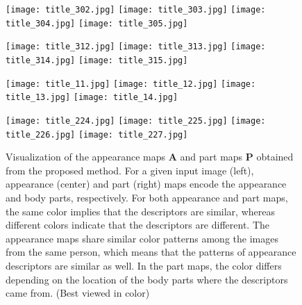 \documentclass{llncs}
\begin{document}
\begin{figure}[t]
\centering
	\begin{minipage}{0.99\linewidth}
	\begin{minipage}{0.24\linewidth}
\centering
      \texttt{[image: title\_302.jpg]}
      \texttt{[image: title\_303.jpg]}
      \texttt{[image: title\_304.jpg]}
      \texttt{[image: title\_305.jpg]}
    \end{minipage}
	\begin{minipage}{0.24\linewidth}
\centering
      \texttt{[image: title\_312.jpg]}
      \texttt{[image: title\_313.jpg]}
      \texttt{[image: title\_314.jpg]}
      \texttt{[image: title\_315.jpg]}
    \end{minipage}
	\begin{minipage}{0.24\linewidth}
\centering
      \texttt{[image: title\_11.jpg]}
      \texttt{[image: title\_12.jpg]}
      \texttt{[image: title\_13.jpg]}
      \texttt{[image: title\_14.jpg]}
    \end{minipage}
	\begin{minipage}{0.24\linewidth}
\centering
      \texttt{[image: title\_224.jpg]}
      \texttt{[image: title\_225.jpg]}
      \texttt{[image: title\_226.jpg]}
      \texttt{[image: title\_227.jpg]}
    \end{minipage}

    \end{minipage}
\vspace{-.2cm}
\caption{Visualization of the appearance maps $\mathbf{A}$ and part maps $\mathbf{P}$ obtained from the proposed method. For a given input image (left), appearance (center) and part (right) maps encode the appearance and body parts, respectively. For both appearance and part maps, the same color implies that the descriptors are similar, whereas different colors indicate that the descriptors are different. The appearance maps share similar color patterns among the images from the same person, which means that the patterns of appearance descriptors are similar as well. In the part maps, the color differs depending on the location of the body parts where the descriptors came from. (Best viewed in color)}
\label{fig:vis}
\vspace{-.1cm}
\end{figure}
\end{document}
